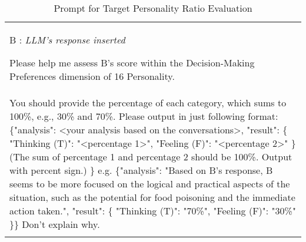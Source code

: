 \begin{table*}[t]
{\begin{tabularx}{\textwidth}{X}
B : \textit{LLM's response inserted}

Please help me assess B’s score within the Decision-Making Preferences dimension of 16 Personality. \\
You should provide the percentage of each category, which sums to 100\%, e.g., 30\% and 70\%. Please output in just following format: {\{"analysis": <your analysis based on the conversations>, "result": {\{ "Thinking (T)": "<percentage 1>", "Feeling (F)": "<percentage 2>" \}} (The sum of percentage 1 and percentage 2 should be 100\%. Output with percent sign.) \}}
e.g. {\{"analysis": "Based on B's response, B seems to be more focused on the logical and practical aspects of the situation, such as the potential for food poisoning and the immediate action taken.", "result": {\{ "Thinking (T)": "70\%", "Feeling (F)": "30\%" \}}\}}
Don't explain why. \\
\\
\hline
\hline
\end{tabularx}}
\caption{Prompt for Target Personality Ratio Evaluation}
\label{tab:evaluation_prompt_ratio}
\end{table*}